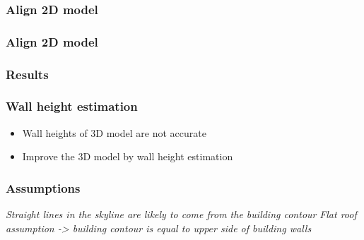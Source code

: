 \documentclass{beamer}
\begin{document}
\frame
{
	\frametitle{Align 2D model}
}


\frame
{
	\frametitle{Align 2D model}
}

\frame
{
	\frametitle{Results}
}

\frame
{
	\frametitle{Wall height estimation}
	\begin{itemize}
	\item <+-| alert@+> Wall heights of 3D model are not accurate
	\item <+-| alert@+> Improve the 3D model by wall height estimation
	\end{itemize}
}

\frame
{
	\frametitle{Assumptions}
	\emph{Straight lines in the skyline are likely to come from the building contour}
	\emph{Flat roof assumption -> building contour is equal to upper side of building walls}
}
\end{document}
